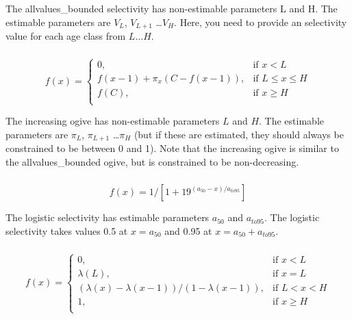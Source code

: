 The allvalues\_bounded selectivity has non-estimable parameters L and H. The estimable parameters are $V_L$, $V_{L+1}$ \ldots $V_H$. Here, you need to provide an selectivity value for each age class from $L \ldots H$.

\subsubsection*{}

\begin{equation} 
f(x)=\begin{cases}
	  0, & \text{if $x < L$} \\
	  f(x-1)+ \pi_x(C-f(x-1)), & \text{if $L \le x \le H$} \\
	  f(C), & \text{if $x \ge H$} \\  
  \end{cases}
\end{equation}

The increasing ogive has non-estimable parameters $L$ and $H$. The estimable parameters are $\pi_L$, $\pi_{L+1}$ \ldots $\pi_H$ (but if these are estimated, they should always be constrained to be between 0 and 1). Note that the increasing ogive is similar to the allvalues\_bounded ogive, but is constrained to be non-decreasing.

\subsubsection*{}

\begin{equation}
  f(x) =1 / [1+19^{(a_{50}-x)/a_{to95}}]
\end{equation}
 
The logistic selectivity has estimable parameters $a_{50}$ and $a_{to95}$. The logistic selectivity takes values 0.5 at $x=a_{50}$ and 0.95 at $x=a_{50}+a_{to95}$. 

\subsubsection*{}

\begin{equation} 
f(x)=\begin{cases}
	  0, & \text{if $x < L$} \\
	  \lambda(L), & \text{if $x=L$} \\
	  \left( \lambda(x)-\lambda(x-1) \right) / \left( 1-\lambda(x-1) \right), & \text{if $L < x < H$} \\
	  1, & \text{if $x \ge H$} \\  
  \end{cases}
\end{equation}

